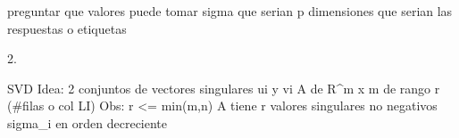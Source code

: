 preguntar que valores puede tomar sigma
que serian p dimensiones
que serian las respuestas o etiquetas


2. 

SVD
Idea: 2 conjuntos de vectores singulares {ui} y {vi} 
A de R^{m x m} de rango r (#filas o col LI)
Obs: r <= min(m,n)
A tiene r valores singulares no negativos {sigma_i} en orden decreciente